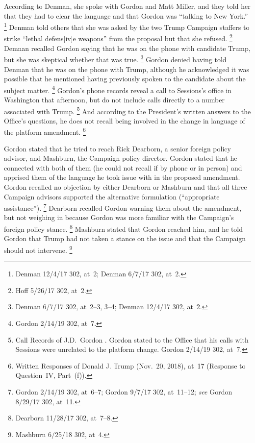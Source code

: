 According to Denman, she spoke with Gordon and Matt Miller, and they told her that they had to clear the language and that Gordon was ``talking to New York.''%
\footnote{Denman 12/4/17 302, at~2;
Denman 6/7/17 302, at~2.}
Denman told others that she was asked by the two Trump Campaign staffers to strike ``lethal defens[iv]e weapons'' from the proposal but that she refused.%
\footnote{Hoff 5/26/17 302, at~2.}
Demnan recalled Gordon saying that he was on the phone with candidate Trump, but she was skeptical whether that was true.%
\footnote{Denman 6/7/17 302, at~2--3, 3--4;
Denman 12/4/17 302, at~2.}
Gordon denied having told Denman that he was on the phone with Trump, although he acknowledged it was possible that he mentioned having previously spoken to the candidate about the subject matter.%
\footnote{Gordon 2/14/19 302, at~7.}
Gordon's phone records reveal a call to Sessions's office in Washington that afternoon, but do not include calls directly to a number associated with Trump.%
\footnote{Call Records of J.D.~Gordon .
Gordon stated to the Office that his calls with Sessions were unrelated to the platform change. Gordon 2/14/19 302, at~7.}
And according to the President's written answers to the Office's questions, he does not recall being involved in the change in language of the platform amendment.%
\footnote{Written Responses of Donald J. Trump (Nov.~20, 2018), at~17 (Response to Question~IV, Part~(f)).}

Gordon stated that he tried to reach Rick Dearborn, a senior foreign policy advisor, and Mashburn, the Campaign policy director.
Gordon stated that he connected with both of them (he could not recall if by phone or in person) and apprised them of the language he took issue with in the proposed amendment.
Gordon recalled no objection by either Dearborn or Mashburn and that all three Campaign advisors supported the alternative formulation (``appropriate assistance'').%
\footnote{Gordon 2/14/19 302, at~6--7;
Gordon 9/7/17 302, at~11--12;
\textit{see} Gordon 8/29/17 302, at~11.}
Dearborn recalled Gordon warning them about the amendment, but not weighing in because Gordon was more familiar with the Campaign's foreign policy stance.%
\footnote{Dearborn 11/28/17 302, at~7--8.}
Mashburn stated that Gordon reached him, and he told Gordon that Trump had not taken a stance on the issue and that the Campaign should not intervene.%
\footnote{Mashburn 6/25/18 302, at~4.}

